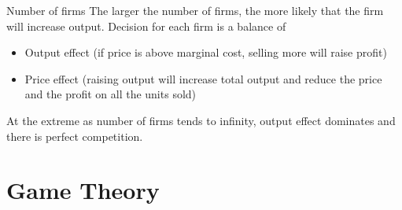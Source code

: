 \documentclass[14pt,xcolor=pdftex,dvipsnames,table]{beamer}\usepackage[]{graphicx}\usepackage[]{color}
\begin{document}
\begin{frame}{Number of firms}
The larger the number of firms, the more likely that the firm will increase output.  Decision for each firm is a balance of 
\pause
\begin{itemize}[<+-| alert@+>]
\item Output effect (if price is above marginal cost, selling more will raise profit)
\item Price effect (raising output will increase total output and reduce the price and the profit on all the units sold)
\end{itemize}
\pause
At the extreme as number of firms tends to infinity, output effect dominates and there is perfect competition. 
\end{frame}


\section{Game Theory}
\end{document}
